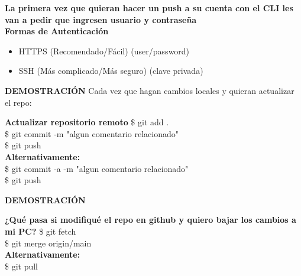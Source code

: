 \documentclass{beamer}
\begin{document}
	\begin{frame}
		\textbf{La primera vez que quieran hacer un push a su cuenta con el CLI les van a pedir que ingresen usuario y contraseña} \\
		\vspace{1cm}
		\textbf{Formas de Autenticación}
		\begin{itemize}
			\item HTTPS (Recomendado/Fácil) (user/password)
			\item SSH (Más complicado/Más seguro) (clave privada)
		\end{itemize}
	\end{frame}

	\begin{frame}
		\textbf{DEMOSTRACIÓN} Cada vez que hagan cambios locales y quieran actualizar el repo:
		\begin{block}{\textbf{Actualizar repositorio remoto}}
			\small \$ git add . \\
			\vspace{0.3cm}
			\small \$ git commit -m "algun comentario relacionado"\\
			\vspace{0.3cm}
			\small \$ git push \\
			\vspace{0.3cm}
			\textbf{Alternativamente:}\\
			\vspace{0.3cm}
			\small \$ git commit -a -m "algun comentario relacionado"\\
			\vspace{0.3cm}
			\small \$ git push \\
			\vspace{0.3cm}
		\end{block}	
	\end{frame}

	\begin{frame}
		\textbf{DEMOSTRACIÓN} 
		\begin{block}{\textbf{¿Qué pasa si modifiqué el repo en github y quiero bajar los cambios a mi PC?}}
			\vspace{0.3cm}
			\small \$ git fetch \\
			\vspace{0.3cm}
			\small \$ git merge origin/main\\
			\vspace{0.3cm}
			\textbf{Alternativamente:}\\
			\vspace{0.3cm}
			\small \$ git pull
			\vspace{0.3cm}
		\end{block}	
	\end{frame}
\end{document}
